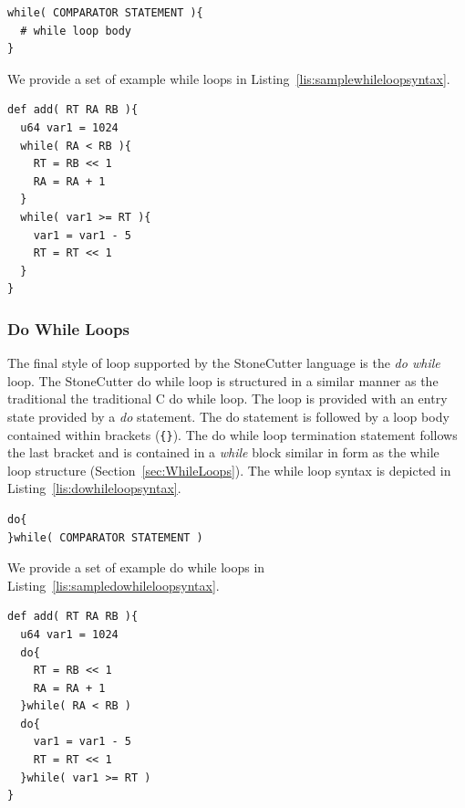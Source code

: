 \documentclass{article}
\begin{document}
\vspace{0.125in}
\begin{lstlisting}[frame=single,style=base,caption={While Loop Syntax},captionpos=b,label={lis:whileloopsyntax}]
while( COMPARATOR STATEMENT ){
  # while loop body
}
\end{lstlisting}

We provide a set of example while loops in Listing~\ref{lis:samplewhileloopsyntax}.

\vspace{0.125in}
\begin{lstlisting}[frame=single,style=base,caption={Sample While Loop Syntax},captionpos=b,label={lis:samplewhileloopsyntax}]
def add( RT RA RB ){
  u64 var1 = 1024
  while( RA < RB ){
    RT = RB << 1
    RA = RA + 1
  }
  while( var1 >= RT ){
    var1 = var1 - 5
    RT = RT << 1
  }
}
\end{lstlisting}

\clearpage
\subsubsection{Do While Loops}
\label{sec:DoWhileLoops}

The final style of loop supported by the StoneCutter language is the \textit{do while} loop.  The StoneCutter do while 
loop is structured in a similar manner as the traditional the traditional C do while loop.  The loop is provided with 
an entry state provided by a \textit{do} statement.  The do statement is followed by a loop body contained within brackets 
(\texttt{\{\}}).  The do while loop termination statement follows the last bracket and is contained in a \textit{while} block similar 
in form as the while loop structure (Section~\ref{sec:WhileLoops}).  The while loop syntax is depicted in 
Listing~\ref{lis:dowhileloopsyntax}.   

\vspace{0.125in}
\begin{lstlisting}[frame=single,style=base,caption={Do While Loop Syntax},captionpos=b,label={lis:dowhileloopsyntax}]
do{
}while( COMPARATOR STATEMENT )
\end{lstlisting}

We provide a set of example do while loops in Listing~\ref{lis:sampledowhileloopsyntax}.

\vspace{0.125in}
\begin{lstlisting}[frame=single,style=base,caption={Sample Do While Loop Syntax},captionpos=b,label={lis:sampledowhileloopsyntax}]
def add( RT RA RB ){
  u64 var1 = 1024
  do{
    RT = RB << 1
    RA = RA + 1
  }while( RA < RB )  
  do{
    var1 = var1 - 5
    RT = RT << 1
  }while( var1 >= RT )
}
\end{lstlisting}
\end{document}
